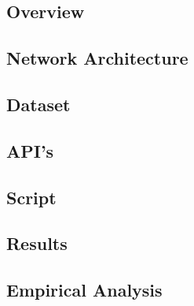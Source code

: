 \subsection*{Overview}
\subsection*{Network Architecture}
\subsection*{Dataset}
\subsection*{API's}
\subsection*{Script}
\subsection*{Results}
\subsection*{Empirical Analysis}
